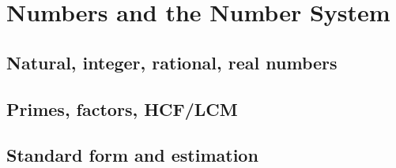 
\section{Numbers and the Number System}

\subsection{Natural, integer, rational, real numbers}


\subsection{Primes, factors, HCF/LCM}


\subsection{Standard form and estimation}

